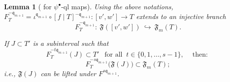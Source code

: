 \documentclass{amsart}
\renewcommand{\sp}{{\ \ }}
\newcommand{\1}{{\mathbb 1 }}
\newcommand{\qq}{\mathfrak{q}}
\newtheorem{lem}[thm]{Lemma}
\theoremstyle{remark}
\numberwithin{equation}{section}
\theoremstyle{definition}
\newcommand{\filled}{{\mathcal {K} }}
\newcommand{\Fjord}{{\mathfrak F}}
\begin{document}
\begin{lem}[{\cite[Lemma~2.4]{DL22} for $\psi^\bullet$-ql maps}]\label{cor:pullback}
Using the above notations,\\ $F^{-\qq_{m+1}}_T=\iota^{\qq_{m+1}}\circ [f\mid T]^{-\qq_{m+1}}\colon [v',w']\to T$ extends to an injective branch
\begin{equation}
\label{eq:0:cor:pullbacks for psi bullet}
F^{-\qq_{m+1}}_T\colon\ \Fjord([v',w'])\ \hookrightarrow \ \Fjord_m(T). 
\end{equation}

If $J\subset T'$ is a subinterval such that \[F_T^{-t\qq_{m+1}}(J)\subset T'\sp\text{ for all }\ t\in \{ 0,1,\dots, s-1\},\sp \sp \text{ then: }\] 
\begin{equation}
\label{eq:cor:pullbacks for psi bullet}
  F_T^{- s\qq_{m+1}} \big(\Fjord(J)\big)\subset\Fjord_m(T);\end{equation}
i.e., $\Fjord(J)$ can be lifted under $F^{ s\qq_{m+1}}$.
\end{lem}

\end{document}

